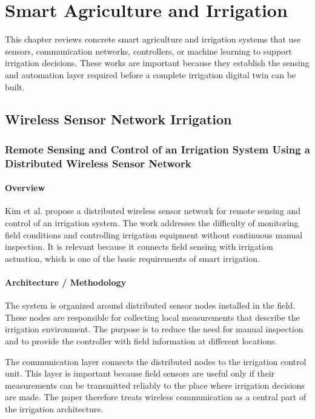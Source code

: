 \chapter{Smart Agriculture and Irrigation}

This chapter reviews concrete smart agriculture and irrigation systems that use sensors, communication networks, controllers, or machine learning to support irrigation decisions. These works are important because they establish the sensing and automation layer required before a complete irrigation digital twin can be built.

\section{Wireless Sensor Network Irrigation}

\subsection[Remote Sensing and Control of an Irrigation System Using a Distributed Wireless Sensor Network]{Remote Sensing and Control of an Irrigation System Using a Distributed Wireless Sensor Network \cite{kim2008wsnIrrigation}}

\subsubsection{Overview}

Kim et al. propose a distributed wireless sensor network for remote sensing and control of an irrigation system. The work addresses the difficulty of monitoring field conditions and controlling irrigation equipment without continuous manual inspection. It is relevant because it connects field sensing with irrigation actuation, which is one of the basic requirements of smart irrigation.

\subsubsection{Architecture / Methodology}

The system is organized around distributed sensor nodes installed in the field. These nodes are responsible for collecting local measurements that describe the irrigation environment. The purpose is to reduce the need for manual inspection and to provide the controller with field information at different locations.

The communication layer connects the distributed nodes to the irrigation control unit. This layer is important because field sensors are useful only if their measurements can be transmitted reliably to the place where irrigation decisions are made. The paper therefore treats wireless communication as a central part of the irrigation architecture.

